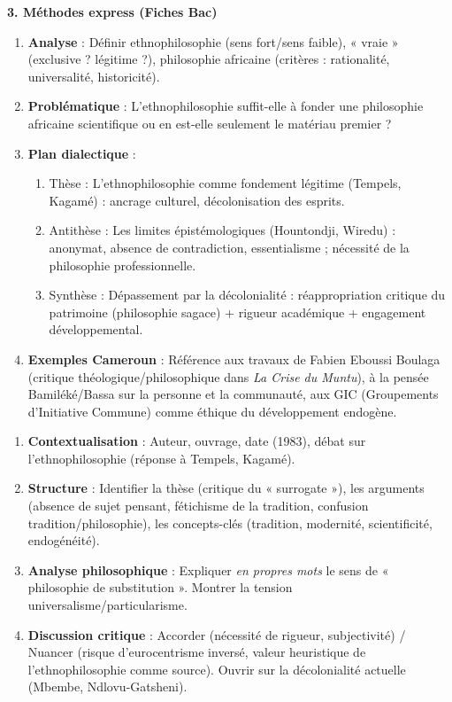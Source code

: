 \documentclass[11pt]{article}
\newcommand{\cle}[1]{{\popxbold\color{popdark}#1}}
\begin{document}
\textbf{3. Méthodes express (Fiches Bac)}
\begin{methode}
\begin{enumerate}
  \item \textbf{Analyse} : Définir ethnophilosophie (sens fort/sens faible), « vraie » (exclusive ? légitime ?), philosophie africaine (critères : rationalité, universalité, historicité).
  \item \textbf{Problématique} : L'ethnophilosophie suffit-elle à fonder une philosophie africaine scientifique ou en est-elle seulement le matériau premier ?
  \item \textbf{Plan dialectique} :
    \begin{enumerate}
      \item Thèse : L'ethnophilosophie comme fondement légitime (Tempels, Kagamé) : ancrage culturel, décolonisation des esprits.
      \item Antithèse : Les limites épistémologiques (Hountondji, Wiredu) : anonymat, absence de contradiction, essentialisme ; nécessité de la philosophie professionnelle.
      \item Synthèse : Dépassement par la \cle{décolonialité} : réappropriation critique du patrimoine (philosophie sagace) + rigueur académique + engagement développemental.
    \end{enumerate}
  \item \textbf{Exemples Cameroun} : Référence aux travaux de Fabien Eboussi Boulaga (critique théologique/philosophique dans \emph{La Crise du Muntu}), à la pensée Bamiléké/Bassa sur la personne et la communauté, aux GIC (Groupements d'Initiative Commune) comme éthique du développement endogène.
\end{enumerate}
\end{methode}

\begin{methode}
\begin{enumerate}
  \item \textbf{Contextualisation} : Auteur, ouvrage, date (1983), débat sur l'ethnophilosophie (réponse à Tempels, Kagamé).
  \item \textbf{Structure} : Identifier la thèse (critique du « surrogate »), les arguments (absence de sujet pensant, fétichisme de la tradition, confusion tradition/philosophie), les concepts-clés (tradition, modernité, scientificité, endogénéité).
  \item \textbf{Analyse philosophique} : Expliquer \emph{en propres mots} le sens de « philosophie de substitution ». Montrer la tension universalisme/particularisme.
  \item \textbf{Discussion critique} : Accorder (nécessité de rigueur, subjectivité) / Nuancer (risque d'eurocentrisme inversé, valeur heuristique de l'ethnophilosophie comme source). Ouvrir sur la décolonialité actuelle (Mbembe, Ndlovu-Gatsheni).
\end{enumerate}
\end{methode}
\end{document}

